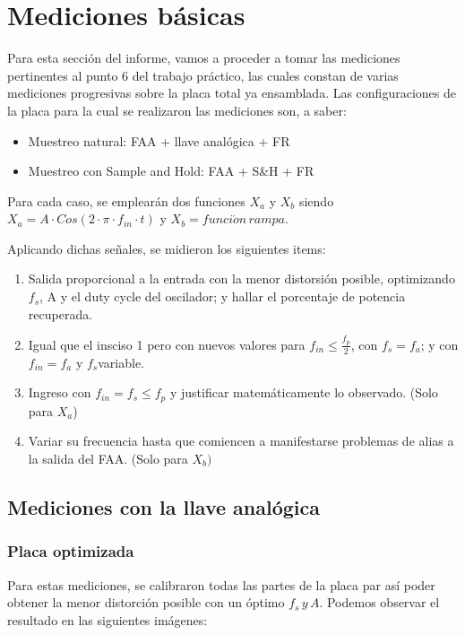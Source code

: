 \documentclass[../../ASSD_TP1_G7.tex]{subfiles}
\begin{document}
\chapter*{Mediciones b\'asicas}
Para esta sección del informe, vamos a proceder a tomar las mediciones
pertinentes al punto 6 del trabajo práctico, las cuales constan de
varias mediciones progresivas sobre la placa total ya ensamblada.
Las configuraciones de la placa para la cual se realizaron las mediciones
son, a saber:
\begin{itemize}
\item Muestreo natural: FAA + llave analógica + FR~
\item Muestreo con Sample and Hold: FAA + S\&H + FR
\end{itemize}
Para cada caso, se emplearán dos funciones $X_{a}$ y $X_{b}$ siendo
$X_{a}=A\cdot Cos(2\cdot\pi\cdot f_{in}\cdot t)$ y $X_{b}=funci\acute{o}n\,rampa$.

Aplicando dichas señales, se midieron los siguientes items:
\begin{enumerate}
\item Salida proporcional a la entrada con la menor distorsión posible,
optimizando $f_{s}$, A y el duty cycle del oscilador; y hallar el
porcentaje de potencia recuperada.
\item Igual que el insciso 1 pero con nuevos valores para $f_{in}\leq\frac{f_{p}}{2}$,
con $f_{s}=f_{a}$; y con $f_{in}=f_{a}$ y $f_{s}$variable.
\item Ingreso con $f_{in}=f_{s}\leq f_{p}$ y justificar matemáticamente
lo observado. (Solo para $X_{a}$)
\item Variar su frecuencia hasta que comiencen a manifestarse problemas
de alias a la salida del FAA. (Solo para $X_{b})$
\end{enumerate}

\section{Mediciones con la llave analógica}

\subsection{Placa optimizada}

Para estas mediciones, se calibraron todas las partes de la placa
par así poder obtener la menor distorción posible con un óptimo $f_{s}\,y\,A$.
Podemos observar el resultado en las siguientes imágenes:
\end{document}
